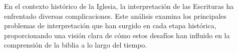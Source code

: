 En el contexto histórico de la Iglesia, la interpretación de las Escrituras ha enfrentado diversas complicaciones. Este análisis examina los principales problemas de interpretación que han surgido en cada etapa histórica, proporcionando una visión clara de cómo estos desafíos han influido en la comprensión de la biblia a lo largo del tiempo.